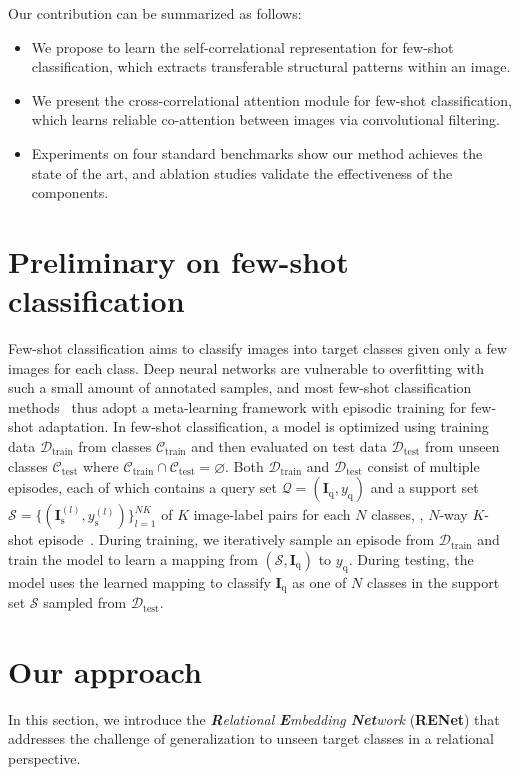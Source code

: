 \documentclass[10pt,twocolumn,letterpaper]{article}
\newcommand{\bI}{\mathbf{I}}
\newcommand{\texts}{{\text{s}}}
\newcommand{\textq}{{\text{q}}}
\newcommand{\ours}{RENet\xspace}
\begin{document}
Our contribution can be summarized as follows:
\begin{itemize}
    \item We propose to learn the self-correlational representation for few-shot classification, which extracts transferable structural patterns within an image.
    \item We present the cross-correlational attention module for few-shot classification, which learns reliable co-attention between images via convolutional filtering.    
    \item Experiments on four standard benchmarks show our method achieves the state of the art, and ablation studies validate the effectiveness of the components.
\end{itemize}
 \section{Preliminary on few-shot classification}
Few-shot classification aims to classify images into target classes given only a few images for each class. 
Deep neural networks are vulnerable to overfitting with such a small amount of annotated samples, and most few-shot classification methods~\cite{matchingnet, ravi2016optimization, protonet} thus adopt a meta-learning framework with episodic training for few-shot adaptation. 
In few-shot classification, a model is optimized using training data $\mathcal{D}_{\text{train}}$ from classes $\mathcal{C}_{\text{train}}$ and then evaluated on test data $\mathcal{D}_{\text{test}}$ from unseen classes $\mathcal{C}_{\text{test}}$ where $\mathcal{C}_{\text{train}} \cap \mathcal{C}_{\text{test}} = \varnothing$.
Both $\mathcal{D}_{\text{train}}$ and $\mathcal{D}_{\text{test}}$ consist of multiple episodes, each of which contains a query set $\mathcal{Q}=(\bI_\textq, y_\textq)$ and a support set $\mathcal{S}=\{(\bI_\texts^{(l)}, y_\texts^{(l)})\}_{l=1}^{NK}$ of $K$ image-label pairs for each $N$ classes, \ie, $N$-way $K$-shot episode~\cite{fei2006one, matchingnet}.
During training, we iteratively sample an episode from $\mathcal{D}_{\text{train}}$ and train the model to learn a mapping from $(\mathcal{S}, \bI_\textq)$ to $y_\textq$.
During testing, the model uses the learned mapping to classify $\bI_\textq$ as one of $N$ classes in the support set $\mathcal{S}$ sampled from $\mathcal{D}_{\text{test}}$. \section {Our approach}
In this section, we introduce the \textit{\textbf{R}elational \textbf{E}mbedding \textbf{Net}work} (\textbf{\ours}) that addresses the challenge of generalization to unseen target classes in a relational perspective.
\end{document}
